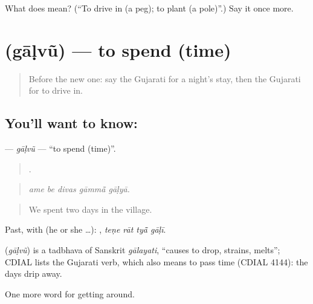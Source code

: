 \begin{tcolorbox}[breakable,colback=teal!4,colframe=teal!35!black,title={Before you move on}]
What does  mean? (\textquotedblleft{}To drive in (a peg); to plant (a pole)\textquotedblright{}.) Say it once more.
\end{tcolorbox}
\section[\texorpdfstring{\gu{ગાળવું} (gāḷvũ)}{ગાળવું (gāḷvũ)}]{ (gāḷvũ) — to spend (time)}

\label{lesson:GU-C412-galvu-spend}



\begin{quote}
Before the new one: say the Gujarati for a night's stay, then the Gujarati for to drive in.
\end{quote}

\subsection*{You'll want to know: }
\textbf{} — \emph{gāḷvũ} — \textquotedblleft{}to spend (time)\textquotedblright{}.

\begin{quote}
    .
\end{quote}

\begin{quote}
\emph{ame be divas gāmmā̃ gāḷyā.}
\end{quote}

\begin{quote}
We spent two days in the village.
\end{quote}

Past, with  (he or she …):    , \emph{teṇe rāt tyā̃ gāḷī}.

\begin{cousinweb}
\textbf{} (\emph{gāḷvũ}) is a tadbhava of Sanskrit \emph{gālayati}, \textquotedblleft{}causes to drop, strains, melts\textquotedblright{}; CDIAL lists the Gujarati verb, which also means to pass time (CDIAL 4144): the days drip away.
\end{cousinweb}

\begin{grammarlens}[title={What you've built}]
One more word for getting around.
\end{grammarlens}


